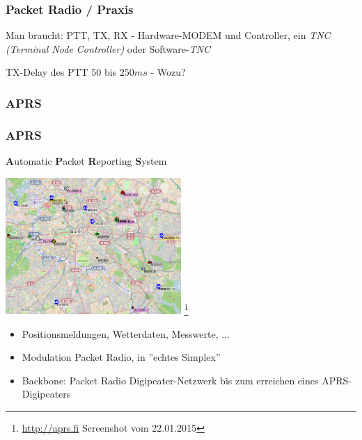 \begin{frame}
    \frametitle{Packet Radio / Praxis}

    Man braucht: PTT, TX, RX - Hardware-MODEM und Controller, ein \emph{TNC
    (Terminal Node Controller)} oder Software-\emph{TNC} \\[2em]


    \begin{block}{TX-Delay des PTT $50$ bis $250ms$ - Wozu?}
    \end{block}

\end{frame}

\subsubsection{APRS}

\begin{frame}
    \frametitle{APRS}

    \textbf{A}utomatic \textbf{P}acket \textbf{R}eporting \textbf{S}ystem

    \begin{center}
        \includegraphics[width=0.5\textwidth]{e16/APRS.png}
        \footnote{\url{http://aprs.fi} Screenshot vom 22.01.2015}
    \end{center}

    \begin{itemize}
        \item Positionsmeldungen, Wetterdaten, Messwerte, ...
        \item Modulation Packet Radio, in ''echtes Simplex''
        \item Backbone: Packet Radio Digipeater-Netzwerk bis zum erreichen eines
              APRS-Digipeaters
    \end{itemize}

\end{frame}


